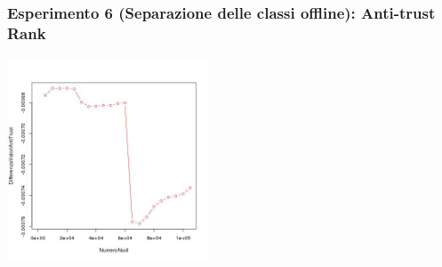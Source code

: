 \documentclass{beamer}
\begin{document}
\begin{frame}
\frametitle{Esperimento 6 {\tiny(Separazione delle classi offline)}: Anti-trust Rank}
\begin{center}
 \includegraphics[height=6cm]{immagini/test6/averageCompleteTest_antitrust_62}
\end{center}
\end{frame}
\end{document}
